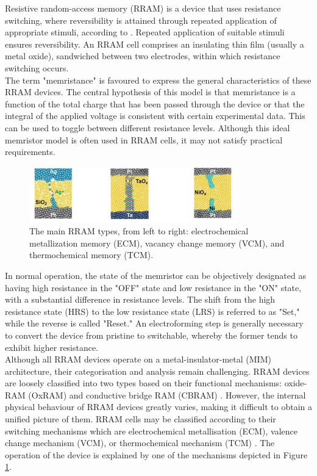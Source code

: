 \noindent Resistive random-access memory (RRAM) is a device that uses resistance switching, where reversibility is attained through repeated application of appropriate stimuli, according to \cite{liu2010controllable}. Repeated application of suitable stimuli ensures reversibility. An RRAM cell comprises an insulating thin film (usually a metal oxide), sandwiched between two electrodes, within which resistance switching occurs. \\

\noindent The term "memristance" is favoured to express the general characteristics of these RRAM devices. The central hypothesis of this model is that memristance is a function of the total charge that has been passed through the device or that the integral of the applied voltage is consistent with certain experimental data. This can be used to toggle between different resistance levels. Although this ideal memristor model is often used in RRAM cells, it may not satisfy practical requirements. \\

\begin{figure}[htbp!] 
\centering    
\includegraphics[width=0.8\textwidth]{Chapter1/Figs/1c.png}
\caption[The main RRAM types.]{The main RRAM types, from left to right: electrochemical metallization memory (ECM), vacancy change memory (VCM), and thermochemical memory (TCM). \cite{goux2016electrochemical}}
\label{fig:1c}
\end{figure} 

\noindent In normal operation, the state of the memristor can be objectively designated as having high resistance in the "OFF" state and low resistance in the "ON" state, with a substantial difference in resistance levels. The shift from the high resistance state (HRS) to the low resistance state (LRS) is referred to as "Set," while the reverse is called "Reset." An electroforming step is generally necessary to convert the device from pristine to switchable, whereby the former tends to exhibit higher resistance. \\

\noindent Although all RRAM devices operate on a metal-insulator-metal (MIM) architecture, their categorisation and analysis remain challenging. RRAM devices are loosely classified into two types based on their functional mechanisms: oxide-RAM (OxRAM) and conductive bridge RAM (CBRAM) \cite{liu2015categorization}. However, the internal physical behaviour of RRAM devices greatly varies, making it difficult to obtain a unified picture of them. RRAM cells may be classified according to their switching mechanisms which are electrochemical metallisation (ECM), valence change mechanism (VCM), or thermochemical mechanism (TCM) \cite{goux2016electrochemical}. The operation of the device is explained by one of the mechanisms depicted in Figure \ref{fig:1c}. \\

